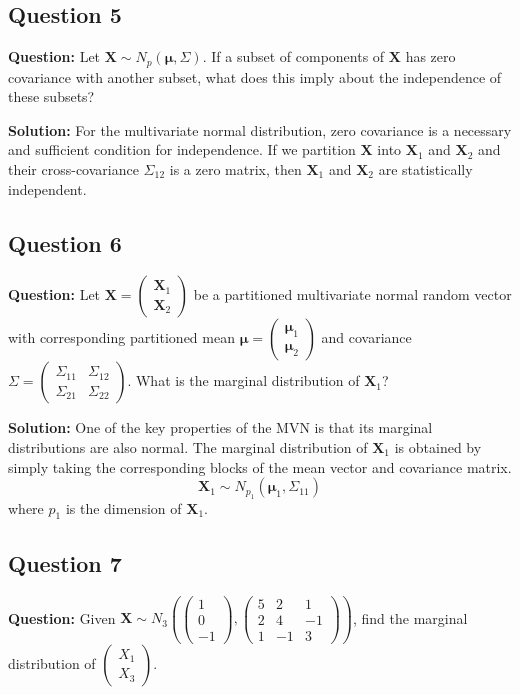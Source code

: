 \subsection*{Question 5}
\textbf{Question:} Let $\mathbf{X} \sim N_p(\boldsymbol{\mu}, \Sigma)$. If a subset of components of $\mathbf{X}$ has zero covariance with another subset, what does this imply about the independence of these subsets?

\textbf{Solution:}
For the multivariate normal distribution, zero covariance is a necessary and sufficient condition for independence. If we partition $\mathbf{X}$ into $\mathbf{X}_1$ and $\mathbf{X}_2$ and their cross-covariance $\Sigma_{12}$ is a zero matrix, then $\mathbf{X}_1$ and $\mathbf{X}_2$ are statistically independent.

\subsection*{Question 6}
\textbf{Question:} Let $\mathbf{X} = \begin{pmatrix} \mathbf{X}_1 \\ \mathbf{X}_2 \end{pmatrix}$ be a partitioned multivariate normal random vector with corresponding partitioned mean $\boldsymbol{\mu} = \begin{pmatrix} \boldsymbol{\mu}_1 \\ \boldsymbol{\mu}_2 \end{pmatrix}$ and covariance $\Sigma = \begin{pmatrix} \Sigma_{11} & \Sigma_{12} \\ \Sigma_{21} & \Sigma_{22} \end{pmatrix}$. What is the marginal distribution of $\mathbf{X}_1$?

\textbf{Solution:}
One of the key properties of the MVN is that its marginal distributions are also normal. The marginal distribution of $\mathbf{X}_1$ is obtained by simply taking the corresponding blocks of the mean vector and covariance matrix.
$$ \mathbf{X}_1 \sim N_{p_1}(\boldsymbol{\mu}_1, \Sigma_{11}) $$
where $p_1$ is the dimension of $\mathbf{X}_1$.

\subsection*{Question 7}
\textbf{Question:} Given $\mathbf{X} \sim N_3\left(\begin{pmatrix} 1 \\ 0 \\ -1 \end{pmatrix}, \begin{pmatrix} 5 & 2 & 1 \\ 2 & 4 & -1 \\ 1 & -1 & 3 \end{pmatrix}\right)$, find the marginal distribution of $\begin{pmatrix} X_1 \\ X_3 \end{pmatrix}$.

